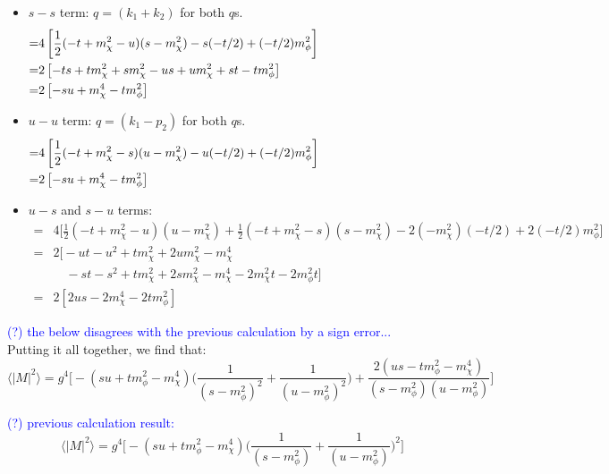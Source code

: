 \documentclass[11pt, oneside]{article}   	%
\begin{document}
\scriptsize
\begin{itemize}
\item { $s-s$ term: $q = (k_1 + k_2)$ for both $q$s.
    \begin{align*}
    = & 4 \left[ \frac{1}{2} (-t + m_\chi^2 - u)(s - m_\chi^2) - s (-t/2) + (-t/2) m_\phi^2 \right] \hspace{4.6cm} \\ 
    = & 2 \left[ -ts + tm_\chi^2 + sm_\chi^2 - us + um_\chi^2 + st - tm_\phi^2 \right] \\
    = & 2 \left[ -su + m_\chi^4 - tm_\phi^2 \right]
    \end{align*}
}
\item { $u-u$ term: $q = (k_1 - p_2)$ for both $q$s.
    \begin{align*}
    = & 4 \left[ \frac{1}{2}(-t + m_\chi^2 - s)(u - m_\chi^2) - u(-t/2) + (-t/2) m_\phi^2 \right] \hspace{4.6cm}  \\
    = & 2 \left[ -su + m_\chi^4 - tm_\phi^2 \right]
    \end{align*}
}
\item { $u-s$ and $s-u$ terms:
    \begin{align*}
    = & 4 \big[ \frac{1}{2}(-t + m_\chi^2 - u)(u-m_\chi^2) + \frac{1}{2}(-t + m_\chi^2 - s)(s-m_\chi^2) - 2(-m_\chi^2)(-t/2) + 2(-t/2)m_\phi^2 \big] \\
    = & 2 \big[ -ut - u^2 + tm_\chi^2 + 2um_\chi^2 - m_\chi^4 \\
    & \quad -st - s^2 + tm_\chi^2 + 2sm_\chi^2 - m_\chi^4 - 2m_\chi^2t - 2m_\phi^2 t \big] \\
    = & 2 \left[ 2us - 2m_\chi^4 - 2tm_\phi^2 \right]
    \end{align*}
}
\end{itemize}
\normalsize

\textcolor{blue}{(?) the below disagrees with the previous calculation by a sign error...} \\
Putting it all together, we find that: 
\[ \langle \left| M \right|^2 \rangle = g^4 \Big[ -(su + tm_\phi^2 - m_\chi^4) \big( \frac{1}{(s-m_\phi^2)^2} + \frac{1}{(u-m_\phi^2)^2} \big) + \frac{2(us - tm_\phi^2 - m_\chi^4)}{(s-m_\phi^2)(u-m_\phi^2)} \Big] \]

\textcolor{blue}{(?) previous calculation result:} \\
\[ \langle \left| M \right|^2 \rangle = g^4 \Big[ -(su + tm_\phi^2 - m_\chi^4) \Big( \frac{1}{(s-m_\phi^2)} + \frac{1}{(u-m_\phi^2)} \Big)^2 \Big] \]
\end{document}
